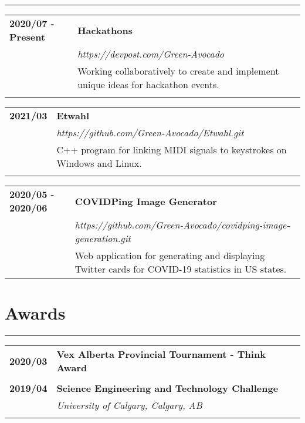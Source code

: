 \documentclass[letterpaper]{article}
\newcommand{\horizontalLine}{%
    {\color{cyan}
    \rule{\textwidth}{1pt}
    \vspace{-1ex}}
}
\begin{document}
        \horizontalLine

        \begin{tabular}{p{} p{}} 
            \textbf{2020/07 - Present} & \large\textbf{Hackathons} \\
            & \emph{https://devpost.com/Green-Avocado} \\
            & Working collaboratively to create and implement unique ideas for hackathon events. \\
            \\
        \end{tabular}

        \begin{tabular}{p{} p{}} 
            \textbf{2021/03} & \large\textbf{Etwahl} \\
            & \emph{https://github.com/Green-Avocado/Etwahl.git} \\
            & C++ program for linking MIDI signals to keystrokes on Windows and Linux. \\
            \\
        \end{tabular}

        \begin{tabular}{p{} p{}} 
            \textbf{2020/05 - 2020/06} & \large\textbf{COVIDPing Image Generator} \\
            & \emph{https://github.com/Green-Avocado/covidping-image-generation.git} \\
            & Web application for generating and displaying Twitter cards for COVID-19 statistics in US states. \\
        \end{tabular}

    \section*{Awards}

        \horizontalLine

        \begin{tabular}{p{} p{}} 
            \textbf{2020/03} & \large\textbf{Vex Alberta Provincial Tournament - Think Award} \\
            \\
            \textbf{2019/04} & \large\textbf{Science Engineering and Technology Challenge} \\
            & \emph{University of Calgary, Calgary, AB} \\
            \\
        \end{tabular}
\end{document}
